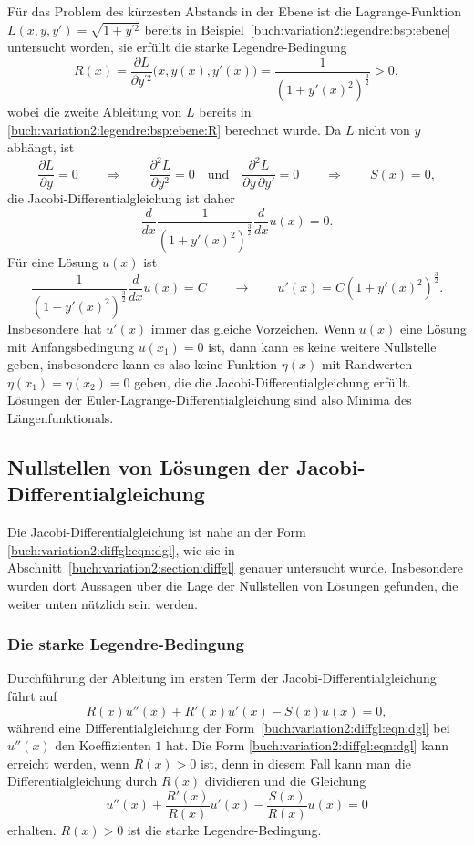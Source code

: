 \begin{beispiel}
Für das Problem des kürzesten Abstands in der Ebene ist
die Lagrange-Funktion $L(x,y,y')=\sqrt{1+y^{\prime 2}}$ bereits
in Beispiel~\ref{buch:variation2:legendre:bsp:ebene}
untersucht worden, sie erfüllt die starke Legendre-Bedingung
\[
R(x)
=
\frac{\partial L}{\partial y^{\prime 2}}\bigl(x,y(x),y'(x)\bigr)
=
\frac{1}{(1+y'(x)^2)^{\frac32}} > 0,
\]
wobei die zweite Ableitung von $L$ bereits in
\eqref{buch:variation2:legendre:bsp:ebene:R}
berechnet wurde.
Da $L$ nicht von $y$ abhängt, ist
\[
\frac{\partial L}{\partial y}=0
\qquad\Rightarrow\qquad
\frac{\partial^2L}{\partial y^2}=0
\quad\text{und}\quad
\frac{\partial^2L}{\partial y\,\partial y'}=0
\qquad\Rightarrow\qquad
S(x)=0,
\]
die Jacobi-Differentialgleichung ist daher
\begin{equation}
\frac{d}{dx} \frac{1}{(1+y'(x)^2)^{\frac32}} \frac{d}{dx} u(x) = 0.
\label{buch:variation2:jacobi:eqn:ebeneQ}
\end{equation}
Für eine Lösung $u(x)$ ist
\[
\frac{1}{(1+y'(x)^2)^{\frac32}}
\frac{d}{dx} u(x) = C
\qquad\rightarrow\qquad
u'(x)
=
C(1+y'(x)^2)^{\frac32}.
\]
Insbesondere hat $u'(x)$ immer das gleiche Vorzeichen.
Wenn $u(x)$ eine Lösung mit Anfangsbedingung $u(x_1)=0$ ist, dann
kann es keine weitere Nullstelle geben, insbesondere kann es
also keine Funktion $\eta(x)$ mit Randwerten $\eta(x_1)=\eta(x_2)=0$
geben, die die Jacobi-Differentialgleichung erfüllt.
Lösungen der Euler-Lagrange-Differentialgleichung sind also Minima
des Längenfunktionals.
\end{beispiel}

%
%
\subsection{Nullstellen von Lösungen der Jacobi-Differentialgleichung
\label{buch:variation2:jacobi:subection:nullstellen}}
Die Jacobi-Differentialgleichung ist nahe an der Form 
\eqref{buch:variation2:diffgl:eqn:dgl},
wie sie in Abschnitt~\ref{buch:variation2:section:diffgl} genauer
untersucht wurde.
Insbesondere wurden dort Aussagen über die Lage der Nullstellen von
Lösungen gefunden, die weiter unten nützlich sein werden.

%
%
\subsubsection{Die starke Legendre-Bedingung}
Durchführung der Ableitung im ersten Term der Jacobi-Differentialgleichung
führt auf
\[
R(x) u''(x) + R'(x) u'(x) - S(x) u(x) = 0,
\]
während eine Differentialgleichung der
Form~\eqref{buch:variation2:diffgl:eqn:dgl}
bei $u''(x)$ den Koeffizienten $1$ hat.
Die Form \eqref{buch:variation2:diffgl:eqn:dgl} kann erreicht
werden, wenn $R(x)>0$ ist, denn in diesem Fall kann man die
Differentialgleichung durch $R(x)$ dividieren und die Gleichung
\[
u''(x) + \frac{R'(x)}{R(x)} u'(x) -\frac{S(x)}{R(x)} u(x) = 0
\]
erhalten.
$R(x)>0$ ist die starke Legendre-Bedingung.

